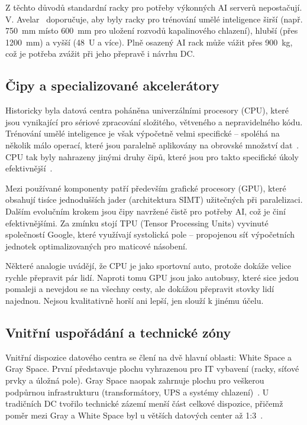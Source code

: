 Z těchto důvodů standardní racky pro potřeby výkonných AI serverů nepostačují. V. Avelar~\cite[s.~13--14]{avelar_ai_2023} doporučuje, aby byly racky pro trénování umělé inteligence širší (např. 750~mm místo 600~mm pro uložení rozvodů kapalinového chlazení), hlubší (přes 1200~mm) a vyšší (48~U a více). Plně osazený AI rack může vážit přes 900~kg, což je potřeba zvážit při jeho přepravě i návrhu DC.

\subsection{Čipy a specializované akcelerátory}
\label{subsec:hardware}

Historicky byla datová centra poháněna univerzálními procesory (CPU), které jsou vynikající pro sériové zpracování složitého, větveného a nepravidelného kódu. Trénování umělé inteligence je však výpočetně velmi specifické -- spoléhá na několik málo operací, které jsou paralelně aplikovány na obrovské množství dat~\cite[s.~133--134]{barroso_data_2026}. CPU tak byly nahrazeny jinými druhy čipů, které jsou pro takto specifické úkoly efektivnější~\cite[s.~1391]{phani_suresh_paladugu_evolution_2025}.

Mezi používané komponenty patří především grafické procesory (GPU), které obsahují tisíce jednodušších jader (architektura SIMT) užitečných při paralelizaci. Dalším evolučním krokem jsou čipy navržené čistě pro potřeby AI, což je činí efektivnějšími. Za zmínku stojí TPU (Tensor Processing Units) vyvinuté společností Google, které využívají systolická pole -- propojenou síť výpočetních jednotek optimalizovaných pro maticové násobení.~\cite[s.~134--139]{barroso_data_2026}

Některé analogie uvádějí, že CPU je jako sportovní auto, protože dokáže velice rychle přepravit pár lidí. Naproti tomu GPU jsou jako autobusy, které sice jedou pomaleji a nevejdou se na všechny cesty, ale dokážou přepravit stovky lidí najednou. Nejsou kvalitativně horší ani lepší, jen slouží k jinému účelu.

\subsection{Vnitřní uspořádání a technické zóny}
\label{subsec:dispozice}

Vnitřní dispozice datového centra se člení na dvě hlavní oblasti: White Space a Gray Space. První představuje plochu vyhrazenou pro IT vybavení (racky, síťové prvky a úložná pole). Gray Space naopak zahrnuje plochu pro veškerou podpůrnou infrastrukturu (transformátory, UPS a systémy chlazení)~\cite[s.~300]{geng_data_2014}. U tradičních DC tvořilo technické zázemí menší část celkové dispozice, přičemž poměr mezi Gray a White Space byl u větších datových center až 1:3~\cite{butler_unlocking_2025}.

